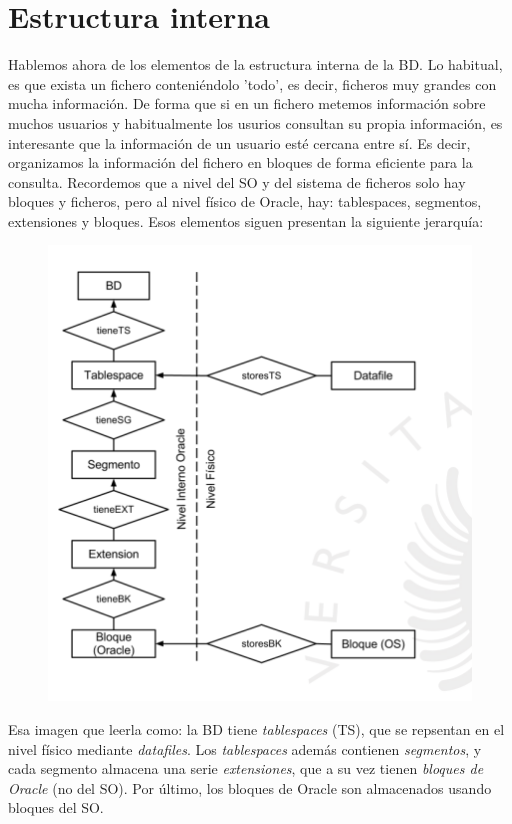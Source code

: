 \section{Estructura interna}

Hablemos ahora de los elementos de la estructura interna de la BD. Lo habitual, es que exista un fichero conteniéndolo 'todo', es decir, ficheros muy grandes con mucha información. De forma que si en un fichero metemos información sobre muchos usuarios y habitualmente los usurios consultan su propia información, es interesante que la información de un usuario esté cercana entre sí. Es decir, organizamos la información del fichero en bloques de forma eficiente para la consulta. Recordemos que a nivel del SO y del sistema de ficheros solo hay bloques y ficheros, pero al nivel físico de Oracle, hay: tablespaces, segmentos, extensiones y bloques. Esos elementos siguen presentan la siguiente jerarquía:

\begin{figure}[H]
  \center
  \includegraphics[scale=0.5]{img/9.png}
\end{figure}

Esa imagen que leerla como: la BD tiene \textit{tablespaces} (TS), que se repsentan en el nivel físico mediante \textit{datafiles}. Los \textit{tablespaces} además contienen \textit{segmentos}, y cada segmento almacena una serie \textit{extensiones}, que a su vez tienen \textit{bloques de Oracle} (no del SO). Por último, los bloques de Oracle son almacenados usando bloques del SO.

